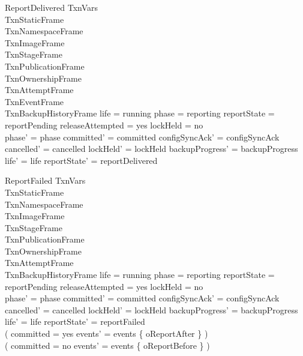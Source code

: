 \documentclass{article}
\begin{document}
\begin{schema}{ReportDelivered}
	\Delta TxnVars \\
	TxnStaticFrame \\
	TxnNamespaceFrame \\
	TxnImageFrame \\
	TxnStageFrame \\
	TxnPublicationFrame \\
	TxnOwnershipFrame \\
	TxnAttemptFrame \\
	TxnEventFrame \\
	TxnBackupHistoryFrame
	\where
	life = running \land phase = reporting \land reportState = reportPending \land
	releaseAttempted = yes \land lockHeld = no \\
	phase' = phase \land committed' = committed \land
	configSyncAck' = configSyncAck \land cancelled' = cancelled \land
	lockHeld' = lockHeld \land backupProgress' = backupProgress \land
	life' = life \land reportState' = reportDelivered
\end{schema}

\begin{schema}{ReportFailed}
	\Delta TxnVars \\
	TxnStaticFrame \\
	TxnNamespaceFrame \\
	TxnImageFrame \\
	TxnStageFrame \\
	TxnPublicationFrame \\
	TxnOwnershipFrame \\
	TxnAttemptFrame \\
	TxnBackupHistoryFrame
	\where
	life = running \land phase = reporting \land reportState = reportPending \land
	releaseAttempted = yes \land lockHeld = no \\
	phase' = phase \land committed' = committed \land
	configSyncAck' = configSyncAck \land cancelled' = cancelled \land
	lockHeld' = lockHeld \land backupProgress' = backupProgress \land
	life' = life \land reportState' = reportFailed \\
	( committed = yes \implies events' = events \cup \{ oReportAfter \} ) \\
	( committed = no \implies events' = events \cup \{ oReportBefore \} )
\end{schema}
\end{document}
